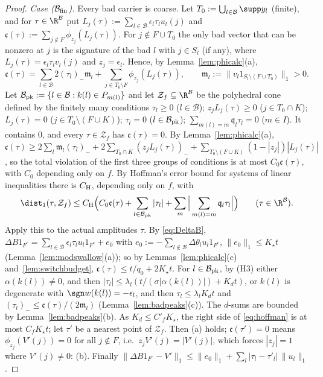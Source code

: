 \begin{proof}
\emph{Case ($\mathcal B_{\rm fin}$).}  Every bad carrier is coarse.  Let $T_0:=\bigcup_{l\in\mathcal B}\supp y_l$ (finite), and for
$\tau\in\R^{\mathcal B}$ put $L_j(\tau):=\sum_{l\in\mathcal B}\epsilon_l
\tau_lu_l(j)$ and $\mathfrak c(\tau):=\sum_{j\notin F}\phi_{z_j}(L_j(\tau))$.
For $j\notin F\cup T_0$ the only bad vector that can be nonzero at $j$ is
the signature of the bad $l$ with $j\in S_l$ (if any), where
$L_j(\tau)=\epsilon_l\tau_lv_l(j)$ and $z_j=\epsilon_l$.  Hence, by
Lemma~\ref{lem:phicalc}(a),
\[
 \mathfrak c(\tau)=\sum_{l\in\mathcal B}2(\tau_l)_-\mathfrak m_l+\sum_{j\in
 T_0\setminus F}\phi_{z_j}(L_j(\tau)),\qquad\mathfrak m_l:=\|v_l1_{S_l
 \setminus(F\cup T_0)}\|_1>0 .
\]
Let $\mathcal B_{\rm pk}:=\{l\in\mathcal B:k(l)\in P_{m(l)}\}$ and let
$\mathcal Z_f\subseteq\R^{\mathcal B}$ be the polyhedral cone defined by
the finitely many conditions $\tau_l\ge0$ ($l\in\mathcal B$);
$z_jL_j(\tau)\ge0$ ($j\in T_0\cap K$); $L_j(\tau)=0$ ($j\in T_0\setminus
(F\cup K)$); $\tau_l=0$ ($l\in\mathcal B_{\rm pk}$); $\sum_{m(l)=m}
\mathfrak q_l\tau_l=0$ ($m\in I$).  It contains $0$, and every
$\tau\in\mathcal Z_f$ has $\mathfrak c(\tau)=0$.  By
Lemma~\ref{lem:phicalc}(a), $\mathfrak c(\tau)\ge2\sum_l\mathfrak m_l
(\tau_l)_-+2\sum_{T_0\cap K}(z_jL_j(\tau))_-+\sum_{T_0\setminus(F\cup K)}
(1-|z_j|)|L_j(\tau)|$, so the total violation of the first three groups
of conditions is at most $C_0\mathfrak c(\tau)$, with $C_0$ depending only
on $f$.  By Hoffman's error bound for systems of linear inequalities
\cite{Hoffman} there is $C_{\rm H}$, depending only on $f$, with
\begin{equation}\label{eq:hoffman}
 \dist_1(\tau,\mathcal Z_f)\le C_{\rm H}\Big(C_0\mathfrak c(\tau)+
 \sum_{l\in\mathcal B_{\rm pk}}|\tau_l|+\sum_m\Big|\sum_{m(l)=m}\mathfrak
 q_l\tau_l\Big|\Big)\qquad(\tau\in\R^{\mathcal B}).
\end{equation}
Apply this to the actual amplitudes $\tau$.  By \eqref{eq:DeltaB},
$\Delta B1_{F^c}=\sum_{l\in\mathcal B}\epsilon_l\tau_lu_l1_{F^c}+e_0$ with
$e_0:=-\sum_{l\notin\mathcal B}\Delta\theta_lu_l1_{F^c}$, $\|e_0\|_1\le
K_\star t$ (Lemma~\ref{lem:modswallow}(a)); so by Lemmas~\ref{lem:phicalc}(c)
and~\ref{lem:switchbudget}, $\mathfrak c(\tau)\le t/q_0+2K_\star t$.  For
$l\in\mathcal B_{\rm pk}$, by (H3) either $\alpha(k(l))\ne0$, and then
$|\tau_l|\le\lambda_l(t/(\sigma|\alpha(k(l))|)+K_dt)$, or $k(l)$ is
degenerate with $\sgn w(k(l))=-\epsilon_l$, and then $\tau_l\le
\lambda_lK_dt$ and $(\tau_l)_-\le\mathfrak c(\tau)/(2\mathfrak m_l)$
(Lemma~\ref{lem:badpeaks}(c)).  The $d$-sums are bounded by
Lemma~\ref{lem:badpeaks}(b).  As $K_d\le C'_fK_\star$, the right side of
\eqref{eq:hoffman} is at most $C_fK_\star t$; let $\tau'$ be a nearest point
of $\mathcal Z_f$.  Then (a) holds; $\mathfrak c(\tau')=0$ means
$\phi_{z_j}(V'(j))=0$ for all $j\notin F$, i.e.\ $z_jV'(j)=|V'(j)|$, which
forces $|z_j|=1$ where $V'(j)\ne0$: (b).  Finally $\|\Delta B1_{F^c}-V'\|_1\le
\|e_0\|_1+\sum_l|\tau_l-\tau'_l|\,\|u_l\|_1$.
\end{proof}
